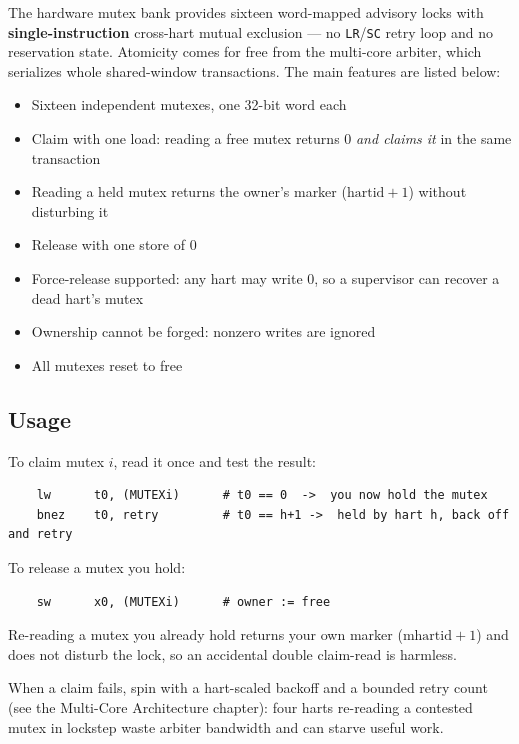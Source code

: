 The hardware mutex bank provides sixteen word-mapped advisory locks with \textbf{single-instruction} cross-hart mutual exclusion --- no \texttt{LR}/\texttt{SC} retry loop and no reservation state. Atomicity comes for free from the multi-core arbiter, which serializes whole shared-window transactions. The main features are listed below:

\begin{itemize}
	\item Sixteen independent mutexes, one 32-bit word each
	\item Claim with one load: reading a free mutex returns 0 \textit{and claims it} in the same transaction
	\item Reading a held mutex returns the owner's marker ($\mathrm{hartid} + 1$) without disturbing it
	\item Release with one store of 0
	\item Force-release supported: any hart may write 0, so a supervisor can recover a dead hart's mutex
	\item Ownership cannot be forged: nonzero writes are ignored
	\item All mutexes reset to free
\end{itemize}

\subsection{Usage}

To claim mutex $i$, read it once and test the result:

\begin{verbatim}
    lw      t0, (MUTEXi)      # t0 == 0  ->  you now hold the mutex
    bnez    t0, retry         # t0 == h+1 ->  held by hart h, back off and retry
\end{verbatim}

To release a mutex you hold:

\begin{verbatim}
    sw      x0, (MUTEXi)      # owner := free
\end{verbatim}

Re-reading a mutex you already hold returns your own marker ($\mathrm{mhartid} + 1$) and does not disturb the lock, so an accidental double claim-read is harmless.

When a claim fails, spin with a hart-scaled backoff and a bounded retry count (see the Multi-Core Architecture chapter): four harts re-reading a contested mutex in lockstep waste arbiter bandwidth and can starve useful work.

